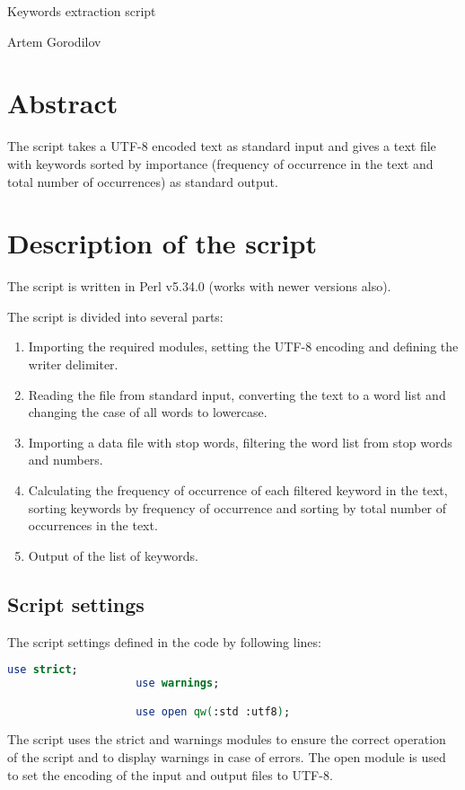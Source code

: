 \documentclass[a4paper,11pt]{article}
\begin{document}
\hline
\begin{center}
\bigskip
\huge Keywords extraction script
\vspace{0.5cm}
\par \large Artem Gorodilov
\vspace{0.5cm}
\bigskip
\end{center}
\hline
\bigskip


\vskip10pt
\begin{minipage}[t]{0.5\textwidth} 
        \section{Abstract}    
            The script takes a UTF-8 encoded text as standard input and gives a text file with keywords sorted by importance (frequency of occurrence in the text and total number of occurrences) as standard output.
        \section{Description of the script}
            The script is written in Perl v5.34.0 \cite{perl} (works with newer versions also).
            \par  The script is divided into several parts: 
            \begin{enumerate}
                \item Importing the required modules, setting the UTF-8 encoding and defining the writer delimiter.
                \item Reading the file from standard input, converting the text to a word list and changing the case of all words to lowercase.
                \item Importing a data file with stop words, filtering the word list from stop words and numbers.
                \item Calculating the frequency of occurrence of each filtered keyword in the text, sorting keywords by frequency of occurrence and sorting by total number of occurrences in the text.
                \item Output of the list of keywords.
            \end{enumerate}
        
            \subsection{Script settings}
                The script settings defined in the code by following lines: 
                \begin{lstlisting}[language=Perl]
                    use strict;
                    use warnings;

                    use open qw(:std :utf8);
                \end{lstlisting}
                The script uses the strict and warnings modules to ensure the correct operation of the script and to display warnings in case of errors. The open module is used to set the encoding of the input and output files to UTF-8.
    \end{minipage}
\end{document}

